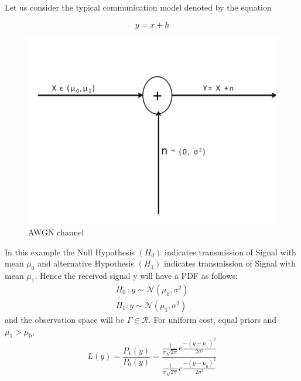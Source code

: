 \documentclass[a4paper,english,12pt]{article}
\begin{document}
\begin{exmp} 
Let us consider the typical communication model  denoted by the equation 

\begin{equation}
y=x+h
\end{equation}
\begin{figure}[h]
\centering
\includegraphics[width=0.7\linewidth]{Figures/AWGN}
\caption[awgn]{AWGN channel}
\label{fig:AWGN}
\end{figure}
In this example the Null Hypothesis $(H_0)$ indicates transmission of Signal with mean $\mu_0$ and alternative Hypothesis $(H_1)$ indicates transmission of Signal with mean $\mu_1$. Hence the received signal y will have a PDF as follows:\\
\begin{eqnarray}
{H_0}~:y \sim \mathcal{N} \left( \mu _0, \sigma^2\right) \\
{H_1}:y \sim \mathcal{N} \left( \mu _1, \sigma^2\right)
\end{eqnarray}
and the observation space will be $\Gamma \in \mathcal{R}$. For uniform cost, equal priors and $\mu_1>\mu_0,$\\
\begin{equation}
L(y) = \frac{{{P_1}(y)}}{{{P_0}(y)}} = \frac{{\frac{1}{{\sigma \sqrt {2\pi } }}e\frac{{ - {{(y - {\mu _1})}^2}}}{{2{\sigma ^2}}}}}{{\frac{1}{{\sigma \sqrt {2\pi } }}e\frac{{ - {{(y - {\mu _0})}^2}}}{{2{\sigma ^2}}}}}
\end{equation}


\end{exmp}
\end{document}
